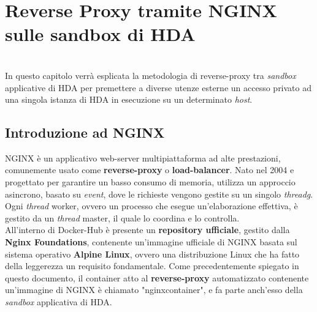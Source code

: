 
\chapter{Reverse Proxy tramite NGINX sulle sandbox di HDA}
\label{cap:nginx-reverse-proxy}
\\
In questo capitolo verrà esplicata la metodologia di reverse-proxy tra \textit{sandbox} applicative di HDA per premettere a diverse utenze esterne un accesso privato ad una singola istanza di HDA in esecuzione su un determinato \textit{host}.

\section{Introduzione ad NGINX}
NGINX è un applicativo web-server multipiattaforma ad alte prestazioni, comunemente usato come \textbf{reverse-proxy} o \textbf{load-balancer}. Nato nel 2004 e progettato per garantire un basso consumo di memoria, utilizza un approccio asincrono, basato su \textit{event}, dove le richieste vengono gestite su un singolo \textit{\gls{threadg}}. Ogni \textit{thread} worker, ovvero un processo che esegue un'elaborazione effettiva, è gestito da un \textit{thread} master, il quale lo coordina e lo controlla.\\
All'interno di Docker-Hub è presente un \textbf{repository ufficiale}, gestito dalla \textbf{Nginx Foundations}, contenente un'immagine ufficiale di NGINX basata sul sistema operativo \textbf{Alpine Linux}, ovvero una distribuzione Linux che ha fatto della leggerezza un requisito fondamentale. Come precedentemente spiegato in questo documento, il container atto al \textbf{reverse-proxy} automatizzato contenente un'immagine di NGINX è chiamato "nginxcontainer", e fa parte anch'esso della \textit{sandbox} applicativa di HDA.

